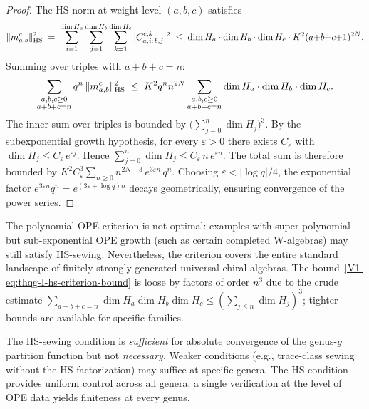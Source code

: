 \begin{proof}
The HS norm at weight level $(a,b,c)$ satisfies
\[
\|m^c_{a,b}\|_{\operatorname{HS}}^2 \;=\; \sum_{i=1}^{\dim H_a} \sum_{j=1}^{\dim H_b} \sum_{k=1}^{\dim H_c} |C^{c,k}_{a,i;\,b,j}|^2 \;\leq\; \dim H_a \cdot \dim H_b \cdot \dim H_c \cdot K^2(a{+}b{+}c{+}1)^{2N}.
\]
Summing over triples with $a + b + c = n$:
\[
\sum_{\substack{a,b,c \geq 0 \\ a+b+c = n}} q^n\,\|m^c_{a,b}\|_{\operatorname{HS}}^2 \;\leq\; K^2 q^n n^{2N} \sum_{\substack{a,b,c \geq 0 \\ a+b+c = n}} \dim H_a \cdot \dim H_b \cdot \dim H_c.
\]
The inner sum over triples is bounded by $\bigl(\sum_{j=0}^n \dim H_j\bigr)^3$. By the subexponential growth hypothesis, for every $\varepsilon > 0$ there exists $C_\varepsilon$ with $\dim H_j \leq C_\varepsilon \,e^{\varepsilon j}$. Hence $\sum_{j=0}^n \dim H_j \leq C_\varepsilon\,n\,e^{\varepsilon n}$. The total sum is therefore bounded by $K^2 C_\varepsilon^3 \sum_{n \geq 0} n^{2N+3}\, e^{3\varepsilon n}\,q^n$. Choosing $\varepsilon < |\log q|/4$, the exponential factor $e^{3\varepsilon n} q^n = e^{(3\varepsilon + \log q)n}$ decays geometrically, ensuring convergence of the power series.
\end{proof}

\begin{remark}
The polynomial-OPE criterion is not optimal: examples with super-polynomial but sub-exponential OPE growth (such as certain completed W-algebras) may still satisfy HS-sewing. Nevertheless, the criterion covers the entire standard landscape of finitely strongly generated universal chiral algebras. The bound~\eqref{V1-eq:thqg-I-hs-criterion-bound} is loose by factors of order $n^3$ due to the crude estimate $\sum_{a+b+c=n} \dim H_a \dim H_b \dim H_c \leq (\sum_{j \leq n} \dim H_j)^3$; tighter bounds are available for specific families.
\end{remark}

\begin{remark}
The HS-sewing condition is \emph{sufficient} for absolute convergence of the genus-$g$ partition function but not \emph{necessary}. Weaker conditions (e.g., trace-class sewing without the HS factorization) may suffice at specific genera. The HS condition provides uniform control across all genera: a single verification at the level of OPE data yields finiteness at every genus.
\end{remark}

